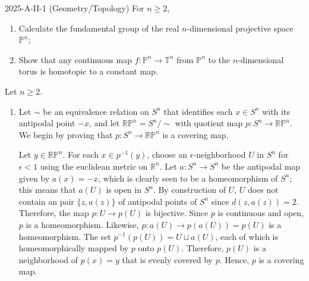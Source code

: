 \documentclass{article}
\begin{document}
\begin{prb}{2025-A-II-1 (Geometry/Topology)}
	For $n\geq 2$, \vspace{-0.35cm}
	\begin{enumerate}[itemsep =-2pt,label = (\roman{*})]
		\item Calculate the fundamental group of the real $n$-dimensional projective space $\mathbb{P}^{n}$; 
		\item Show that any continuous map $f: \mathbb{P}^{n} \to \mathbb{T}^{n}$ from $\mathbb{P}^{n}$ to the $n$-dimensional torus is homotopic to a constant map. 
	\end{enumerate}
\end{prb}
\begin{solutions}
	Let $n \geq 2$. \vspace{-0.35cm}
	
	\begin{enumerate}[itemsep =-2pt,label = (\roman{*})]
		\item Let $\sim$ be an equivalence relation on $S^{n}$ that identifies each $x \in S^{n}$ with its antipodal point $-x$, and let $\mathbb{RP}^{n} = S^{n}/\sim$ with quotient map $p: S^{n} \to \mathbb{RP}^{n}$. We begin by proving that $p: S^{n} \to \mathbb{RP}^{n}$ is a covering map. 
		
		Let $y \in \mathbb{RP}^{n}$. For each $x \in p^{-1}(y)$, choose an $\epsilon$-neighborhood $U$ in $S^{n}$ for $\epsilon < 1$ using the euclidean metric on $\mathbb{R}^{n}$. Let $a: S^{n} \to S^{n}$ be the antipodal map given by $a(x)= -x$, which is clearly seen to be a homeomorphism of $S^{n}$; this means that $a(U)$ is open in $S^{n}$. By construction of $U$, $U$ does not contain an pair $\{z, a(z)\}$ of antipodal points of $S^{n}$ since $d(z, a(z)) = 2$. Therefore, the map $p: U\to p(U)$ is bijective. Since $p$ is continuous and open, $p$ is a homeomorphism. Likewise, $p: a(U) \to p(a(U)) = p(U)$ is a homeomorphism. The set $p^{-1}(p(U)) = U \sqcup a(U)$, each of which is homeomorphically mapped by $p$ onto $p(U)$. Therefore, $p(U)$ is a neighborhood of $p(x) = y$ that is evenly covered by $p$. Hence, $p$ is a covering map. 
		

\end{enumerate}
\end{solutions}
\end{document}
